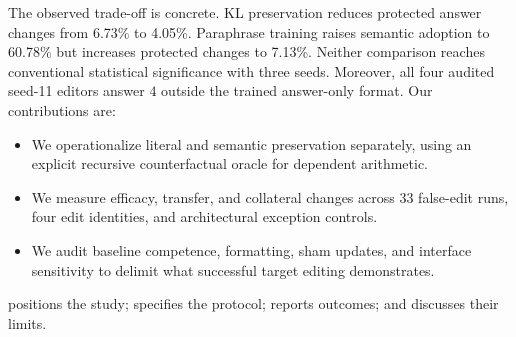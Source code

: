 The observed trade-off is concrete. KL preservation reduces protected answer changes from 6.73\% to 4.05\%. Paraphrase training raises semantic adoption to 60.78\% but increases protected changes to 7.13\%. Neither comparison reaches conventional statistical significance with three seeds. Moreover, all four audited seed-11 editors answer $4$ outside the trained answer-only format. Our contributions are:
\begin{itemize}[leftmargin=*,itemsep=0pt,topsep=0pt]
\item We operationalize literal and semantic preservation separately, using an explicit recursive counterfactual oracle for dependent arithmetic.
\item We measure efficacy, transfer, and collateral changes across 33 false-edit runs, four edit identities, and architectural exception controls.
\item We audit baseline competence, formatting, sham updates, and interface sensitivity to delimit what successful target editing demonstrates.
\end{itemize}
 positions the study;  specifies the protocol;  reports outcomes; and  discusses their limits.


